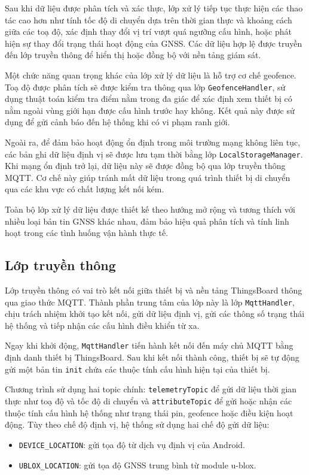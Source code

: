 \documentclass[../DoAn.tex]{subfiles}
\begin{document}
Sau khi dữ liệu được phân tích và xác thực, lớp xử lý tiếp tục thực hiện các thao tác cao hơn như tính tốc độ di chuyển dựa trên thời gian thực và khoảng cách giữa các toạ độ, xác định thay đổi vị trí vượt quá ngưỡng cấu hình, hoặc phát hiện sự thay đổi trạng thái hoạt động của GNSS. Các dữ liệu hợp lệ được truyền đến lớp truyền thông để hiển thị hoặc đồng bộ với nền tảng giám sát.

Một chức năng quan trọng khác của lớp xử lý dữ liệu là hỗ trợ cơ chế geofence. Toạ độ được phân tích sẽ được kiểm tra thông qua lớp \texttt{GeofenceHandler}, sử dụng thuật toán kiểm tra điểm nằm trong đa giác để xác định xem thiết bị có nằm ngoài vùng giới hạn được cấu hình trước hay không. Kết quả này được sử dụng để gửi cảnh báo đến hệ thống khi có vi phạm ranh giới.

Ngoài ra, để đảm bảo hoạt động ổn định trong môi trường mạng không liên tục, các bản ghi dữ liệu định vị sẽ được lưu tạm thời bằng lớp \texttt{LocalStorageManager}. Khi mạng ổn định trở lại, dữ liệu này sẽ được đồng bộ qua lớp truyền thông MQTT. Cơ chế này giúp tránh mất dữ liệu trong quá trình thiết bị di chuyển qua các khu vực có chất lượng kết nối kém.

Toàn bộ lớp xử lý dữ liệu được thiết kế theo hướng mở rộng và tương thích với nhiều loại bản tin GNSS khác nhau, đảm bảo hiệu quả phân tích và tính linh hoạt trong các tình huống vận hành thực tế.
\subsection{Lớp truyền thông}
\label{subsection:4.2.3}
Lớp truyền thông có vai trò kết nối giữa thiết bị và nền tảng ThingsBoard thông qua giao thức MQTT. Thành phần trung tâm của lớp này là lớp \texttt{MqttHandler}, chịu trách nhiệm khởi tạo kết nối, gửi dữ liệu định vị, gửi các thông số trạng thái hệ thống và tiếp nhận các cấu hình điều khiển từ xa. 

Ngay khi khởi động, \texttt{MqttHandler} tiến hành kết nối đến máy chủ MQTT bằng định danh thiết bị ThingsBoard. Sau khi kết nối thành công, thiết bị sẽ tự động gửi một bản tin \texttt{init} chứa các thuộc tính cấu hình hiện tại của thiết bị.

Chương trình sử dụng hai topic chính: \texttt{telemetryTopic} để gửi dữ liệu thời gian thực như toạ độ và tốc độ di chuyển và \texttt{attributeTopic} để gửi hoặc nhận các thuộc tính cấu hình hệ thống như trạng thái pin, geofence hoặc điều kiện hoạt động. Tùy theo chế độ định vị, hệ thống sử dụng hai chế độ gửi dữ liệu:
\begin{itemize}
    \item \texttt{DEVICE\_LOCATION}: gửi tọa độ từ dịch vụ định vị của Android.
    \item \texttt{UBLOX\_LOCATION}: gửi tọa độ GNSS trung bình từ module u-blox.
\end{itemize}
\end{document}
